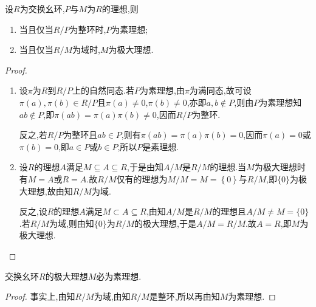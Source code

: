 \documentclass[../../main.tex]{subfiles}%
\begin{document}
\begin{theorem}\label{theorem:抽象代数--定理2.8.1}
设$R$为交换幺环,$P$与$M$为$R$的理想,则
\begin{enumerate}[(1)]
\item\label{theorem:抽象代数--定理2.8.1-1} 当且仅当$R/P$为整环时,$P$为素理想;

\item\label{theorem:抽象代数--定理2.8.1-2} 当且仅当$R/M$为域时,$M$为极大理想.
\end{enumerate}
\end{theorem}
\begin{proof}
\begin{enumerate}[(1)]
\item 设$\pi$为$R$到$R/P$上的自然同态.若$P$为素理想,由$\pi$为满同态,故可设$\pi(a),\pi(b)\in R/P$且$\pi(a) \neq 0$,$\pi(b) \neq 0$,亦即$a,b \notin P$,则由$P$为素理想知$ab \notin P$,即$\pi(ab) = \pi(a)\pi(b) \neq 0$,因而$R/P$为整环.

反之,若$R/P$为整环且$ab \in P$,则有$\pi(ab) = \pi(a)\pi(b) = 0$,因而$\pi(a) = 0$或$\pi(b) = 0$,即$a \in P$或$b \in P$,所以$P$是素理想.

\item 设$R$的理想$A$满足$M \subseteq A \subseteq R$,于是由知$A/M$是$R/M$的理想.当$M$为极大理想时有$M = A$或$R = A$.故$R/M$仅有的理想为$M/M=M=\left\{ 0 \right\} $与$R/M$,即$\{0\}$为极大理想,故由知$R/M$为域.

反之,设$R$的理想$A$满足$M \subset A \subseteq R$,由知$A/M$是$R/M$的理想且$A/M\neq M=\{0\}$.若$R/M$为域,则由知$\{0\}$为$R/M$的极大理想,于是$A/M = R/M$.故$A = R$,即$M$为极大理想.
\end{enumerate}
\end{proof}

\begin{corollary}\label{corollary:抽象代数--推论2.8.1}
交换幺环$R$的极大理想$M$必为素理想.
\end{corollary}
\begin{proof}
事实上,由知$R/M$为域,由知$R/M$是整环,所以再由知$M$为素理想.
\end{proof}
\end{document}

